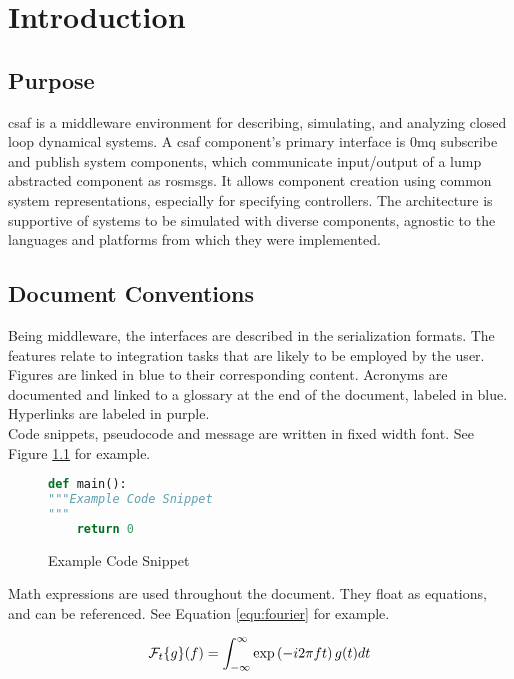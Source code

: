\chapter{Introduction}

\section{Purpose}
\acrshort{csaf} is a middleware environment for describing, simulating, and analyzing closed loop dynamical 
systems. A \acrshort{csaf} component's primary interface is \acrlong{0mq} subscribe and publish system 
components, which communicate input/output of a lump abstracted component as \acrshort{ros}msgs. It 
allows component creation using common system representations, especially for specifying controllers. The 
architecture is supportive of systems to be simulated with diverse components, agnostic to the languages 
and platforms from which they were implemented.


\section{Document Conventions}

Being middleware, the interfaces are described in the serialization formats. The features 
relate to integration tasks that are likely to be employed by the user. \\

Figures are linked in blue to their corresponding content. Acronyms are documented and linked to a glossary 
at the end of the document, labeled in blue. Hyperlinks are labeled in purple. \\

Code snippets, pseudocode and message are written in fixed width font. See Figure \ref{code:example} for 
example.

\begin{figure}[h]
\centering
\begin{lstlisting}[language=Python]
def main():
"""Example Code Snippet
"""
	return 0
\end{lstlisting}
\caption{Example Code Snippet}
\label{code:example}
\end{figure}

Math expressions are used throughout the document. They float as equations, and can be referenced. See 
Equation \ref{equ:fourier} for example.

\begin{equation} \label{equ:fourier}
\mathcal{F}_t\{g\}(f) = \int_{-\infty}^{\infty} \exp\left({-i 2\pi f t}\right) g(t) dt \\
\end{equation}


